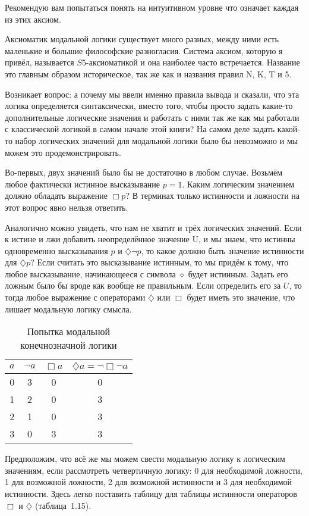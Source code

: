 Рекомендую вам попытаться понять на интуитивном уровне что означает каждая из этих аксиом.

Аксиоматик модальной логики существует много разных, между ними есть маленькие и большие философские разногласия. Система аксиом, которую я привёл, называется $S5$-аксиоматикой и она наиболее часто встречается. Название это главным образом историческое, так же как и названия правил N, K, T и 5.

Возникает вопрос: а почему мы ввели именно правила вывода и сказали, что эта логика определяется синтаксически, вместо того, чтобы просто задать какие-то дополнительные логические значения и работать с ними так же как мы работали с классической логикой в самом начале этой книги? На самом деле задать какой-то набор логических значений для модальной логики было бы невозможно и мы можем это продемонстрировать.

Во-первых, двух значений было бы не достаточно в любом случае. Возьмём любое фактически истинное высказывание $p = 1$. Каким логическим значением должно обладать выражение $\Box p$? В терминах только истинности и ложности на этот вопрос явно нельзя ответить.

Аналогично можно увидеть, что нам не хватит и трёх логических значений. Если к истине и лжи добавить неопределённое значение U, и мы знаем, что истинны одновременно высказывания $p$ и $\diamondsuit \neg p$, то какое должно быть значение истинности для $\diamondsuit p$? Если считать это высказывание истинным, то мы придём к тому, что любое высказывание, начинающееся с символа $\diamond$ будет истинным. Задать его ложным было бы вроде как вообще не правильным. Если определить его за $U$, то тогда любое выражение с операторами $\diamondsuit$ или $\Box$ будет иметь это значение, что лишает модальную логику смысла.

\begin{table}[h]
\centering
\begin{tabular}{c | c c c}
$a$ & $\neg a$ & $\Box a$ & $\diamondsuit a = \neg\Box\neg a$ \\
\hline
0 & 3 & 0 & 0 \\
1 & 2 & 0 & 3 \\
2 & 1 & 0 & 3 \\
3 & 0 & 3 & 3
\end{tabular}
\caption{Попытка модальной конечнозначной логики}\label{table:kleene-or}
\end{table}

Предположим, что всё же мы можем свести модальную логику к логическим значениям, если рассмотреть четвертичную логику: 0 для необходимой ложности, 1 для возможной ложности, 2 для возможной истинности и 3 для необходимой истинности. Здесь легко поставить таблицу для таблицы истинности операторов $\Box$  и $\diamondsuit$ (таблица~1.15).

